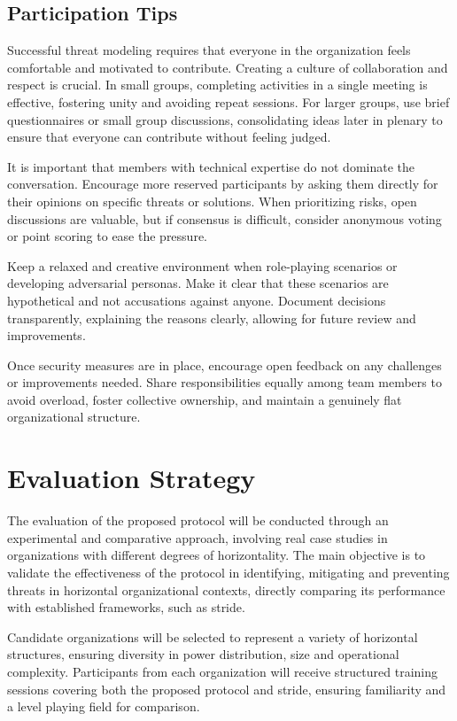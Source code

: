 \subsection{Participation Tips}
\label{subsec:participation_tips}

Successful threat modeling requires that everyone in the organization feels comfortable
and motivated to contribute. Creating a culture of collaboration and respect is
crucial. In small groups, completing activities in a single meeting is
effective, fostering unity and avoiding repeat sessions. For larger groups, use
brief questionnaires or small group discussions, consolidating ideas later in
plenary to ensure that everyone can contribute without feeling judged.

It is important that members with technical expertise do not dominate the
conversation. Encourage more reserved participants by asking them directly for
their opinions on specific threats or solutions. When prioritizing risks, open
discussions are valuable, but if consensus is difficult, consider anonymous
voting or point scoring to ease the pressure.

Keep a relaxed and creative environment when role-playing scenarios or
developing adversarial personas. Make it clear that these scenarios are
hypothetical and not accusations against anyone. Document decisions
transparently, explaining the reasons clearly, allowing for future review and
improvements.

Once security measures are in place, encourage open feedback on any challenges
or improvements needed. Share responsibilities equally among team members to
avoid overload, foster collective ownership, and maintain a genuinely flat
organizational structure.

\section{Evaluation Strategy}
\label{sec:evaluation_strategy}

The evaluation of the proposed protocol will be conducted through an
experimental and comparative approach, involving real case studies in
organizations with different degrees of horizontality. The main objective is to
validate the effectiveness of the protocol in identifying, mitigating and
preventing threats in horizontal organizational contexts, directly comparing its
performance with established frameworks, such as \gls{stride}.

Candidate organizations will be selected to represent a variety of horizontal
structures, ensuring diversity in power distribution, size and operational
complexity. Participants from each organization will receive structured training
sessions covering both the proposed protocol and \gls{stride}, ensuring
familiarity and a level playing field for comparison.

